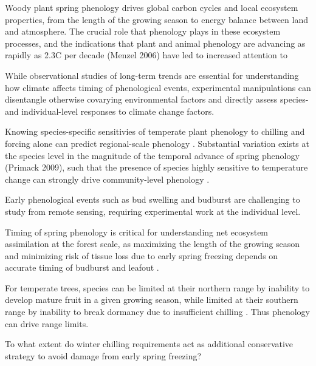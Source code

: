 \documentclass{article}
\begin{document}

Woody plant spring phenology drives global carbon cycles and local ecosystem properties, from the length of the growing season to energy balance between land and atmosphere. The crucial role that phenology plays in these ecosystem processes, and the indications that plant and animal phenology are advancing as rapidly as 2.3\degree C per decade (Menzel 2006) have led to increased attention to 

While observational studies of long-term trends are essential for understanding how climate affects timing of phenological events, experimental manipulations can disentangle otherwise covarying environmental factors and directly assess species- and individual-level responses to climate change factors. 

Knowing species-specific sensitivies of temperate plant phenology to chilling and forcing alone can predict regional-scale phenology \cite{Chuine:2000}. Substantial variation exists at the species level in the magnitude of the temporal advance of spring phenology (Primack 2009), such that the presence of species highly sensitive to temperature change can strongly drive community-level phenology \cite{Diez:2012}.

Early phenological events such as bud swelling and budburst are challenging to study from remote sensing, requiring experimental work at the individual level. 

Timing of spring phenology is critical for understanding net ecosystem assimilation at the forest scale, as maximizing the length of the growing season and minimizing risk of tissue loss due to early spring freezing depends on accurate timing of budburst and leafout \cite{Basler:2014aa}.

For temperate trees, species can be limited at their northern range by inability to develop mature fruit in a given growing season, while limited at their southern range by inability to break dormancy due to insufficient chilling \cite{Chuine:2010}. Thus phenology can drive range limits.



To what extent do winter chilling requirements act as additional conservative strategy to avoid damage from early spring freezing?
\end{document}
